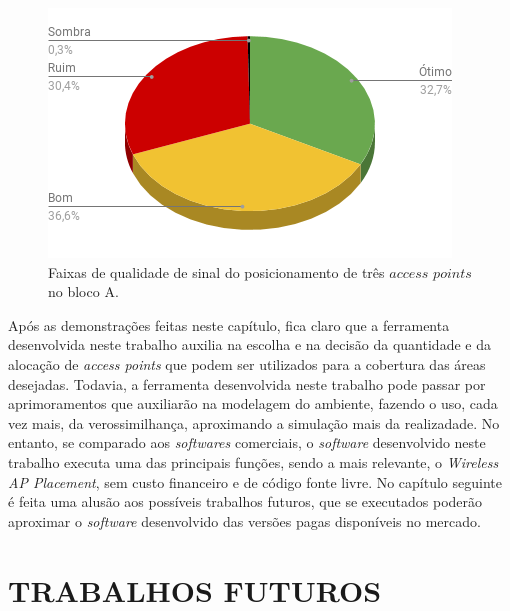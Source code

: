 \documentclass[
	12pt,				%
	twoside,			%
	a4paper,			%
	english,			%
	french,				%
	spanish,			%
	brazil				%
	]{abntex2}
\begin{document}
\begin{figure}[ht]
    \caption{\label{percent_bloco_a_3} Faixas de qualidade de sinal do posicionamento de três $access$ $points$ no bloco A.}
    \begin{center}
        \includegraphics[scale=0.7]{imagens/percent-bloco-a-3.png}
    \end{center}
\end{figure}

Após as demonstrações feitas neste capítulo, fica claro que a ferramenta
desenvolvida neste trabalho auxilia na escolha e na decisão da
quantidade e da alocação de \emph{access points} que podem ser
utilizados para a cobertura das áreas desejadas. Todavia, a ferramenta
desenvolvida neste trabalho pode passar por aprimoramentos que
auxiliarão na modelagem do ambiente, fazendo o uso, cada vez mais, da
verossimilhança, aproximando a simulação mais da realizadade. No
entanto, se comparado aos \emph{softwares} comerciais, o \emph{software}
desenvolvido neste trabalho executa uma das principais funções, sendo a
mais relevante, o \emph{Wireless AP Placement}, sem custo financeiro e
de código fonte livre. No capítulo seguinte é feita uma alusão aos
possíveis trabalhos futuros, que se executados poderão aproximar o
\emph{software} desenvolvido das versões pagas disponíveis no mercado.

\chapter{TRABALHOS FUTUROS}\label{sec:futuros}
\end{document}
